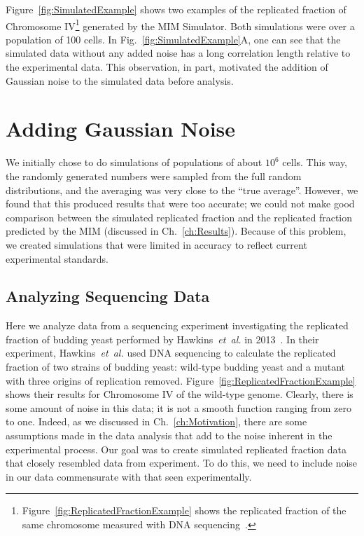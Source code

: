 		Figure~\ref{fig:SimulatedExample} shows two examples of the replicated fraction of Chromosome IV\footnote{
		Figure~\ref{fig:ReplicatedFractionExample} shows the replicated fraction of the same chromosome measured with DNA sequencing~\cite{StochasticTermination}.}
		generated by the MIM Simulator.
		Both simulations were over a population of 100 cells.
		In Fig.~\ref{fig:SimulatedExample}A, one can see that the simulated data without any added noise has a long correlation length relative to the experimental data.
		This observation, in part, motivated the addition of Gaussian noise to the simulated data before analysis.
		
		
	\section{Adding Gaussian Noise}
	\label{sec:Noise}
	
	We initially chose to do simulations of populations of about $10^6$ cells.
	This way, the randomly generated numbers were sampled from the full random distributions, and the averaging was very close to the ``true average''.
	However, we found that this produced results that were too accurate; we could not make good comparison between the simulated replicated fraction and the replicated fraction predicted by the MIM (discussed in Ch.~\ref{ch:Results}).
	Because of this problem, we created simulations that were limited in accuracy to reflect current experimental standards.
	
	
		\subsection{Analyzing Sequencing Data}
		\label{subsec:SequencingNoise}
		
		Here we analyze data from a sequencing experiment investigating the replicated fraction of budding yeast performed by Hawkins~\emph{et~al.} in 2013~\cite{StochasticTermination}.
		In their experiment, Hawkins~\emph{et~al.} used DNA sequencing to calculate the replicated fraction of two strains of budding yeast: wild-type budding yeast and a mutant with three origins of replication removed.
		Figure~\ref{fig:ReplicatedFractionExample} shows their results for Chromosome IV of the wild-type genome.
		Clearly, there is some amount of noise in this data; it is not a smooth function ranging from zero to one.
		Indeed, as we discussed in Ch.~\ref{ch:Motivation}, there are some assumptions made in the data analysis that add to the noise inherent in the experimental process.
		Our goal was to create simulated replicated fraction data that closely resembled data from experiment.
		To do this, we need to include noise in our data commensurate with that seen experimentally.
		
